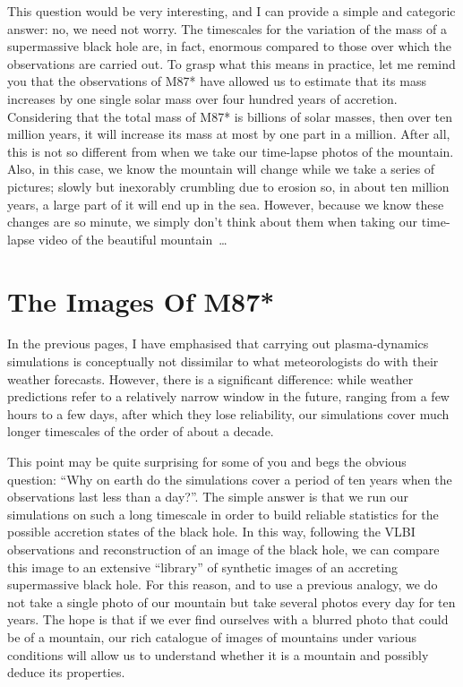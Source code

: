 This question would be very interesting, and I can provide a simple and categoric
answer: no, we need not worry. The timescales for the variation of the mass of a
supermassive black hole are, in fact, enormous compared to those over which the
observations are carried out. To grasp what this means in practice, let me remind you
that the observations of M87* have allowed us to estimate that its
mass increases by one single solar mass over four hundred years of accretion.
Considering that the total mass of M87* is billions of solar masses, then over ten
million years, it will increase its mass at most by one part in a million. After all,
this is not so different from when we take our time-lapse photos of the mountain. Also,
in this case, we know the mountain will change while we take a series of pictures;
slowly but inexorably crumbling due to erosion so, in about ten million years, a large
part of it will end up in the sea. However, because we know these changes are so minute,
we simply don't think about them when taking our time-lapse video of the beautiful
mountain~\ldots{}

\section{The Images Of M87*}\label{sec:07-images}

In the previous pages, I have emphasised that carrying out
plasma-dynamics simulations is conceptually not dissimilar to what
meteorologists do with their weather forecasts. However, there is a significant
difference: while weather predictions refer to a relatively narrow window in the future,
ranging from a few hours to a few days, after which they lose reliability, our
simulations cover much longer timescales of the order of about a decade.

This point may be quite surprising for some of you and begs the obvious question: ``Why
on earth do the simulations cover a period of ten years when the observations last less
than a day?''. The simple answer is that we run our simulations on such a long timescale
in order to build reliable statistics for the possible accretion states of the black
hole. In this way, following the VLBI observations and reconstruction of an image of the
black hole, we can compare this image to an extensive ``library'' of synthetic
images of an accreting supermassive black hole. For this reason, and
to use a previous analogy, we do not take a single photo of our mountain but take
several photos every day for ten years. The hope is that if we ever find ourselves with
a blurred photo that could be of a mountain, our rich catalogue of images of mountains
under various conditions will allow us to understand whether it is a mountain and
possibly deduce its properties.

